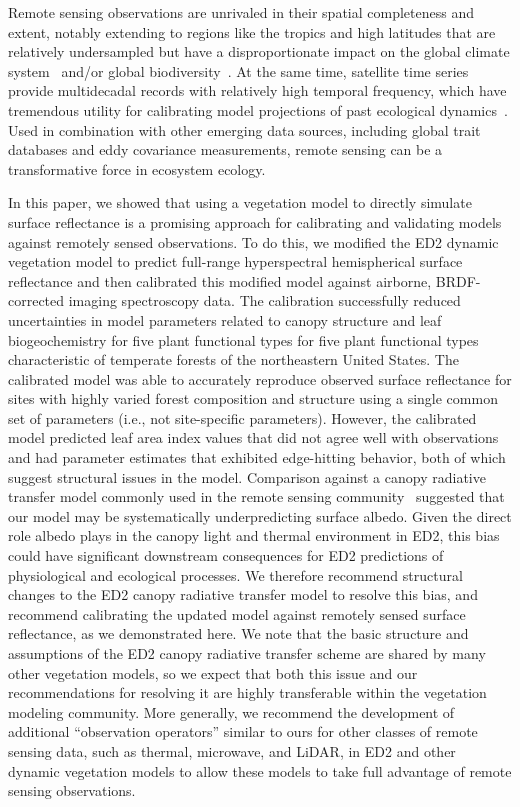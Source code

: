 \conclusions

Remote sensing observations are unrivaled in their spatial completeness and extent, notably extending to regions like the tropics and high latitudes that are relatively undersampled but have a disproportionate impact on the global climate system~\citep{schimel2015observing} and/or global biodiversity~\citep{jetz_2016_monitoring}.
At the same time, satellite time series provide multidecadal records with relatively high temporal frequency, which have tremendous utility for calibrating model projections of past ecological dynamics~\citep{kennedy2014bringing, pasquarella2016imagery}.
Used in combination with other emerging data sources, including global trait databases and eddy covariance measurements, remote sensing can be a transformative force in ecosystem ecology.

In this paper, we showed that using a vegetation model to directly simulate surface reflectance is a promising approach for calibrating and validating models against remotely sensed observations.
To do this, we modified the ED2 dynamic vegetation model to predict full-range hyperspectral hemispherical surface reflectance and then calibrated this modified model against airborne, BRDF-corrected imaging spectroscopy data.
The calibration successfully reduced uncertainties in model parameters related to canopy structure and leaf biogeochemistry for five plant functional types for five plant functional types characteristic of temperate forests of the northeastern United States.
The calibrated model was able to accurately reproduce observed surface reflectance for sites with highly varied forest composition and structure using a single common set of parameters (i.e., not site-specific parameters).
However, the calibrated model predicted leaf area index values that did not agree well with observations and had parameter estimates that exhibited edge-hitting behavior, both of which suggest structural issues in the model.
Comparison against a canopy radiative transfer model commonly used in the remote sensing community~\citep[PRO4SAIL,][]{verhoef2007coupled} suggested that our model may be systematically underpredicting surface albedo.
Given the direct role albedo plays in the canopy light and thermal environment in ED2, this bias could have significant downstream consequences for ED2 predictions of physiological and ecological processes.
We therefore recommend structural changes to the ED2 canopy radiative transfer model to resolve this bias, and recommend calibrating the updated model against remotely sensed surface reflectance, as we demonstrated here.
We note that the basic structure and assumptions of the ED2 canopy radiative transfer scheme are shared by many other vegetation models,
so we expect that both this issue and our recommendations for resolving it are highly transferable within the vegetation modeling community.
More generally, we recommend the development of additional ``observation operators'' similar to ours for other classes of remote sensing data, such as thermal, microwave, and LiDAR, in ED2 and other dynamic vegetation models to allow these models to take full advantage of remote sensing observations.
